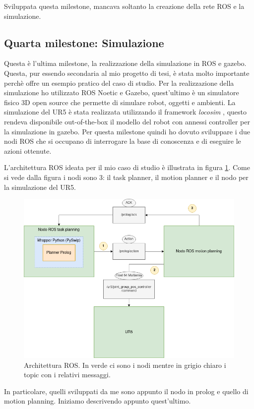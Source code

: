 Sviluppata questa milestone, mancava soltanto la creazione della rete ROS e la simulazione. 


\subsection{Quarta milestone: Simulazione}
\label{subsec:simulation}
Questa è l'ultima milestone, la realizzazione della simulazione in ROS e gazebo. Questa, pur essendo secondaria al mio progetto di tesi, è stata molto importante perchè offre un esempio pratico del caso di studio.
Per la realizzazione della simulazione ho utilizzato ROS Noetic e Gazebo, quest'ultimo è un simulatore fisico 3D open source che permette di simulare robot, oggetti e ambienti.
La simulazione del UR5 è stata realizzata utilizzando il framework \textit{locosim} \cite{focchi2023locosim}, questo rendeva disponibile out-of-the-box il modello del robot con annessi controller per la simulazione in gazebo.
Per questa milestone quindi ho dovuto sviluppare i due nodi ROS che si occupano di interrogare la base di conoscenza e di eseguire le azioni ottenute.

L'architettura ROS ideata per il mio caso di studio è illustrata in figura \ref{fig:archros}. Come si vede dalla figura i nodi sono 3: il task planner, il motion planner e il nodo per la simulazione del UR5. 
\begin{figure}[t]
    \centering
    \includegraphics[scale=0.5]{images/ArchROS.drawio.png}
    \caption{Architettura ROS. In verde ci sono i nodi mentre in grigio chiaro i topic con i relativi messaggi.}
    \label{fig:archros}
\end{figure}
In particolare, quelli sviluppati da me sono appunto il nodo in prolog e quello di motion planning. Iniziamo descrivendo appunto quest'ultimo.

